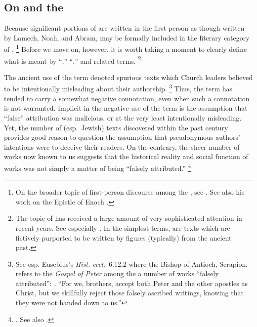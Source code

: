 \subsection{On \Psy and the \Psa}

Because significant portions of \ga are written in the first person as though written by Lamech, Noah, and Abram, \ga may be formally included in the literary category of \psy.%
    \footnote{%
        On the broader topic of first-person discourse among the \dss, see 
        \cite{stuckenbruck_roitman-etal2011}. See also his work on the Epistle of Enoch \cite*{stuckenbruck_dsd2010}.}
Before we move on, however, it is worth taking a moment to clearly define what is meant by ``\psy,'' ``\psa,'' and related terms.%
    \footnote{The topic of \psy has received a large amount of very sophisticated attention in recent years. See especially
        \cite{mroczek2016}
        \cite{tigchelaar_tigchelaar2014}
        \cite{reed_towsend-moulie2011}
        \cite{reed_jts2009}
        \cite{reed_ditomasso-turcescu2008}
        \cite{najman_hilhorst-puech2007}
        \cite{najman2003}.
        In the simplest terms, \psa are texts which are fictively purported to be written by figures (typically) from the ancient past.}

The ancient use of the term \psa denoted spurious texts which Church leaders believed to be intentionally misleading about their authorship.%
    \footnote{See esp. Eusebius's \emph{Hist. eccl.}~6.12.2 where the Bishop of Antioch, Serapion, refers to the \emph{Gospel of Peter} among the a number of works ``falsely attributed'': . ``For we, brothers, accept both Peter and the other apostles as Christ, but we skillfully reject those falsely ascribed writings, knowing that they were not handed down to us.''}
Thus, the term has tended to carry a somewhat negative connotation, even when such a connotation is not warranted. Implicit in the negative use of the term is the assumption that ``false'' attribution was malicious, or at the very least intentionally misleading. Yet, the number of (esp.~Jewish) \psgraphical texts discovered within the past century provides good reason to question the assumption that pseudonymous authors' intentions were to deceive their readers. On the contrary, the sheer number of \psgraphical works now known to us suggests that the historical reality and social function of \psgraphical works was not simply a matter of being ``falsely attributed.''%
    \footnote{\Cite[53--58]{mroczek2016}. See also \cite{reed_jts2009}.}

